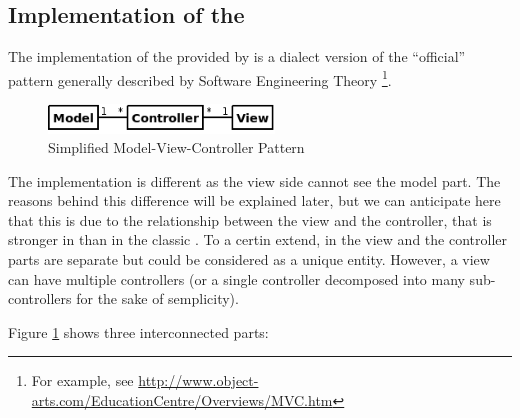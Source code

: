 \subsection{\label{MVC} Implementation of the \mvc}

The implementation of the \mvc provided by \pygtkmvc is a dialect 
version of the ``official'' pattern generally described by Software
Engineering Theory \footnote{For example, see
  \url{http://www.object-arts.com/EducationCentre/Overviews/MVC.htm}}.

\begin{figure}[htbp]
\begin{center}
\includegraphics[width=6cm]{figs/png/mvc.png}
\caption{\label{MVC_f}Simplified Model-View-Controller Pattern}
\end{center}
\end{figure}
The implementation is different as the view side cannot see the model
part. The reasons behind this difference will be explained later, but
we can anticipate here that this is due to the relationship between
the view and the controller, that is stronger in \pygtkmvc than in the
classic \mvc. To a certin extend, in \pygtkmvc the view and the
controller parts are separate but could be considered as a unique
entity. However, a view can have multiple controllers (or a single
controller decomposed into many sub-controllers for the sake of
semplicity).

\smallskip

Figure \ref{MVC_f} shows three interconnected parts:

